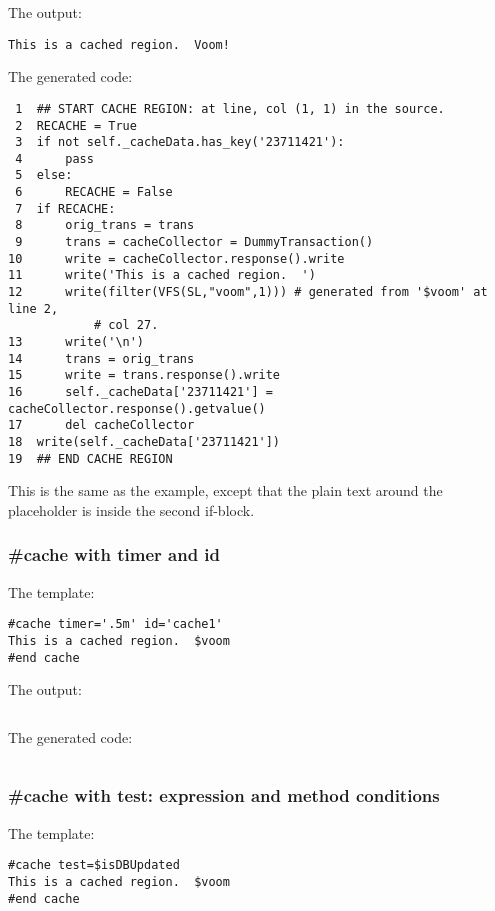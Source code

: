 The output:
\begin{verbatim}
This is a cached region.  Voom!
\end{verbatim}

The generated code:
\begin{verbatim}
 1  ## START CACHE REGION: at line, col (1, 1) in the source.
 2  RECACHE = True
 3  if not self._cacheData.has_key('23711421'):
 4      pass
 5  else:
 6      RECACHE = False
 7  if RECACHE:
 8      orig_trans = trans
 9      trans = cacheCollector = DummyTransaction()
10      write = cacheCollector.response().write
11      write('This is a cached region.  ')
12      write(filter(VFS(SL,"voom",1))) # generated from '$voom' at line 2, 
            # col 27.
13      write('\n')
14      trans = orig_trans
15      write = trans.response().write
16      self._cacheData['23711421'] = cacheCollector.response().getvalue()
17      del cacheCollector
18  write(self._cacheData['23711421'])
19  ## END CACHE REGION
\end{verbatim}

This is the same as the  example, except that the plain text
around the placeholder is inside the second if-block.  

\subsubsection{\#cache with timer and id}
\label{output.cache.directive.timer}

The template:
\begin{verbatim}
#cache timer='.5m' id='cache1'
This is a cached region.  $voom
#end cache
\end{verbatim}

The output:
\begin{verbatim}
\end{verbatim}

The generated code:
\begin{verbatim}
\end{verbatim}

\subsubsection{\#cache with test: expression and method conditions}
\label{output.cache.directive.test}

The template:
\begin{verbatim}
#cache test=$isDBUpdated
This is a cached region.  $voom
#end cache
\end{verbatim}

